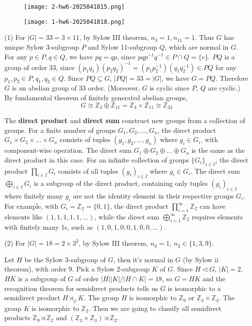 \begin{exercise}
\begin{figure}[H]
\centering
\texttt{[image: 2-hw6-2025041815.png]}
\label{}
\end{figure}
\end{exercise}
\begin{figure}[H]
\centering
\texttt{[image: 1-hw6-2025041818.png]}
\label{}
\end{figure}
(1) For $\lvert G \rvert=33=3\times11$, by Sylow III theorem, $n_3=1,n_{11}=1$. Thus $G$ has unique Sylow 3-subgroup $P$ and Sylow 11-subgroup $Q$, which are normal in $G$. For any $p\in P, q\in Q$, we have $pq=qp$, since $pqp^{-1}q^{-1}\in P\cap Q=\{ e \}$. $PQ$ is a group of order 33, since $(p_1q_1)(p_2q_2)^{-1}=(p_1p_2^{-1})(q_1q_2 ^{-1})\in PQ$ for any $p_1, p_2\in P, q_1, q_2\in Q$. Since $PQ\subseteq G$, $\lvert PQ \rvert=33=\lvert G \rvert$, we have $G=PQ$. Therefore $G$ is an abelian group of 33 order. (Moreover, $G$ is cyclic since $P$, $Q$ are cyclic.) By fundamental theorem of finitely generated abelian groups,
\[
G\cong \mathbb{Z}_{3}\oplus  \mathbb{Z}_{11}  =\mathbb{Z}_{3}\times \mathbb{Z}_{11} \cong \mathbb{Z}_{33}
\]
\begin{remark}
The \textbf{direct product} and \textbf{direct sum} construct new groups from a collection of groups.
For a finite number of groups $G_1, G_2, \dots, G_n$, the direct product $G_1 \times G_2 \times \dots \times G_n$ consists of tuples $(g_1, g_2, \dots, g_n)$ where $g_i \in G_i$, with component-wise operation. The direct sum $G_1 \oplus G_2 \oplus \dots \oplus G_n$ is the same as the direct product in this case.
For an infinite collection of groups $\{G_i\}_{i \in I}$, the direct product $\prod_{i \in I} G_i$ consists of all tuples $(g_i)_{i \in I}$ where $g_i \in G_i$. The direct sum $\bigoplus_{i \in I} G_i$ is a subgroup of the direct product, containing only tuples $(g_i)_{i \in I}$ where finitely many $g_i$ are not the identity element in their respective groups $G_i$.
For example, with $G_i = \mathbb{Z}_2 = \{0, 1\}$, the direct product $\prod_{i=1}^{\infty} \mathbb{Z}_2$ can have elements like $(1, 1, 1, 1, 1, \dots)$, while the direct sum $\bigoplus_{i=1}^{\infty} \mathbb{Z}_2$ requires elements with finitely many 1s, such as $(1, 0, 1, 0, 0, 1, 0, 0, \dots)$.
\end{remark}
(2) For $\lvert G \rvert=18=2\times3^{2}$, by Sylow III theorem, $n_3=1$, $n_2\in \{ 1,3,9 \}$.

Let $H$ be the Sylow 3-subgroup of $G$, then it's normal in $G$ (by Sylow ii theorem), with order 9. Pick a Sylow 2-subgroup $K$ of $G$. Since $H\lhd G$, $\lvert K \rvert=2$, $HK$ is a subgroup of $G$ of order $\lvert H \rvert \lvert K \rvert/\lvert H\cap K \rvert=18$, so $G=HK$ and the recognition theorem for semidirect products tells us $G$ is isomorphic to a semidirect product $H\rtimes_{\varphi}K$. The group $H$ is isomorphic to $\mathbb{Z}_{9}$ or $\mathbb{Z}_{3}\times \mathbb{Z}_{3}$. The group $K$ is isomorphic to $\mathbb{Z}_{2}$. Then we are going to classify all semidirect products $\mathbb{Z}_{9}\rtimes \mathbb{Z}_{2}$ and $(\mathbb{Z}_{3}\times \mathbb{Z}_{3})\rtimes \mathbb{Z}_{2}$.

